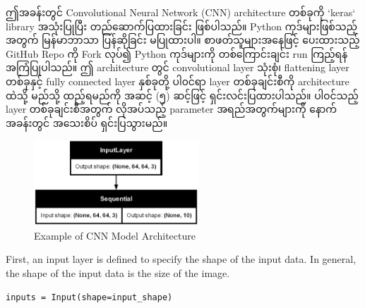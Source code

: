 ဤအခန်းတွင် Convolutional Neural Network (CNN) architecture တစ်ခုကို `keras` library အသုံးပြုပြီး တည်ဆောက်ပြထားခြင်း ဖြစ်ပါသည်။ Python ကုဒ်များဖြစ်သည့်အတွက် မြန်မာဘာသာ ပြန်ဆိုခြင်း မပြုထားပါ။ စာဖတ်သူများအနေဖြင့် ပေးထားသည့် GitHub Repo ကို Fork လုပ်၍ Python ကုဒ်များကို တစ်ကြောင်းချင်း run ကြည့်ရန် အကြံပြုပါသည်။ ဤ architecture တွင် convolutional layer သုံးစုံ၊ flattening layer တစ်ခုနှင့် fully connected layer နှစ်ခုတို့ ပါ၀င်ရာ layer တစ်ခုချင်းစီကို architecture ထဲသို့ မည်သို့ ထည့်ရမည်ကို အဆင့် (၅) ဆင့်ဖြင့် ရှင်းလင်းပြထားပါသည်။ ပါ၀င်သည့် layer တစ်ခုချင်းစီအတွက် လိုအပ်သည့် parameter အရည်အတွက်များကို နောက်အခန်းတွင် အသေးစိပ် ရှင်းပြသွားမည်။ 

\vspace{0.5em}
\begin{figure}[h]%
\centering
\includegraphics[width=0.55\textwidth]{imgs/cnn_model_seq.png}
\caption{Example of CNN Model Architecture}\label{fig:CNNArch}
\end{figure}

\begin{step}
First, an input layer is defined to specify the shape of the input data. In general, the shape of the input data is the size of the image. 
\begin{verbatim}
inputs = Input(shape=input_shape)
\end{verbatim}
\end{step}


